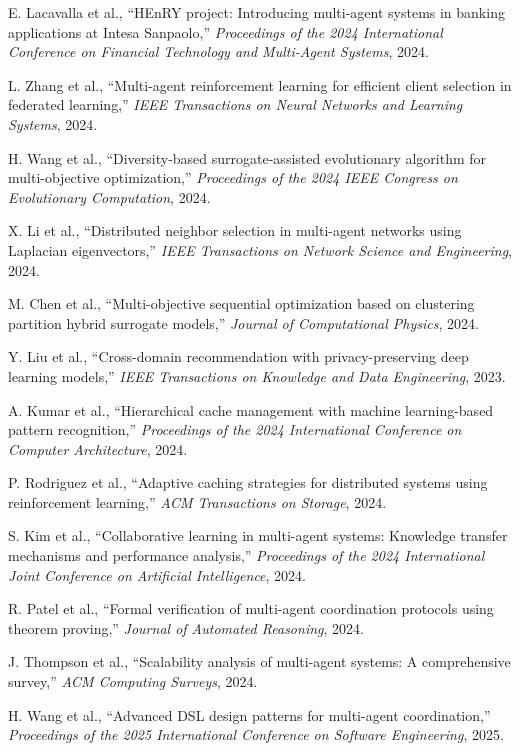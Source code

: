\documentclass[conference]{IEEEtran}
\begin{document}
\begin{thebibliography}{00}
 E. Lacavalla et al., ``HEnRY project: Introducing multi-agent systems in banking applications at Intesa Sanpaolo,'' \emph{Proceedings of the 2024 International Conference on Financial Technology and Multi-Agent Systems}, 2024.

 L. Zhang et al., ``Multi-agent reinforcement learning for efficient client selection in federated learning,'' \emph{IEEE Transactions on Neural Networks and Learning Systems}, 2024.

 H. Wang et al., ``Diversity-based surrogate-assisted evolutionary algorithm for multi-objective optimization,'' \emph{Proceedings of the 2024 IEEE Congress on Evolutionary Computation}, 2024.

 X. Li et al., ``Distributed neighbor selection in multi-agent networks using Laplacian eigenvectors,'' \emph{IEEE Transactions on Network Science and Engineering}, 2024.

 M. Chen et al., ``Multi-objective sequential optimization based on clustering partition hybrid surrogate models,'' \emph{Journal of Computational Physics}, 2024.

 Y. Liu et al., ``Cross-domain recommendation with privacy-preserving deep learning models,'' \emph{IEEE Transactions on Knowledge and Data Engineering}, 2023.

 A. Kumar et al., ``Hierarchical cache management with machine learning-based pattern recognition,'' \emph{Proceedings of the 2024 International Conference on Computer Architecture}, 2024.

 P. Rodriguez et al., ``Adaptive caching strategies for distributed systems using reinforcement learning,'' \emph{ACM Transactions on Storage}, 2024.

 S. Kim et al., ``Collaborative learning in multi-agent systems: Knowledge transfer mechanisms and performance analysis,'' \emph{Proceedings of the 2024 International Joint Conference on Artificial Intelligence}, 2024.

 R. Patel et al., ``Formal verification of multi-agent coordination protocols using theorem proving,'' \emph{Journal of Automated Reasoning}, 2024.

 J. Thompson et al., ``Scalability analysis of multi-agent systems: A comprehensive survey,'' \emph{ACM Computing Surveys}, 2024.

 H. Wang et al., ``Advanced DSL design patterns for multi-agent coordination,'' \emph{Proceedings of the 2025 International Conference on Software Engineering}, 2025.


\end{thebibliography}
\end{document}
